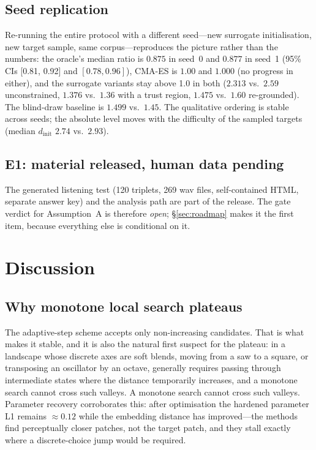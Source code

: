 \documentclass[11pt]{article}
\newcommand{\rRetU}{1.45}
\newcommand{\rGS}{2.59}
\newcommand{\rGST}{1.36}
\newcommand{\rGR}{1.60}
\newcommand{\rGT}{0.875}
\newcommand{\rGTci}{[0.81, 0.92]}
\newcommand{\rCMA}{1.00}
\newcommand{\sOneGT}{0.877}
\newcommand{\sOneCMA}{1.000}
\newcommand{\sOneGS}{2.313}
\newcommand{\sOneGST}{1.376}
\newcommand{\sOneGR}{1.475}
\newcommand{\sOneRetU}{1.499}
\begin{document}
\subsection{Seed replication}

Re-running the entire protocol with a different seed---new surrogate
initialisation, new target sample, same corpus---reproduces the picture rather
than the numbers: the oracle's median ratio is $\rGT$ in seed~0 and $\sOneGT$
in seed~1 (95\% CIs \rGTci{} and $[0.78, 0.96]$), CMA-ES is $\rCMA$ and
$\sOneCMA$ (no progress in either), and the surrogate variants stay above 1.0
in both ($\sOneGS$ vs.\ $\rGS$ unconstrained, $\sOneGST$ vs.\ $\rGST$ with a
trust region, $\sOneGR$ vs.\ $\rGR$ re-grounded). The blind-draw baseline is
$\sOneRetU$ vs.\ $\rRetU$. The qualitative ordering is stable across seeds;
the absolute level moves with the difficulty of the sampled targets (median
$d_{\text{init}}$ $2.74$ vs.\ $2.93$).

\subsection{E1: material released, human data pending}

The generated listening test (120 triplets, 269 wav files, self-contained HTML,
separate answer key) and the analysis path are part of the release. The gate
verdict for Assumption~A is therefore \emph{open}; \S\ref{sec:roadmap} makes it
the first item, because everything else is conditional on it.

\section{Discussion}\label{sec:discussion}

\subsection{Why monotone local search plateaus}\label{sec:disc-plateau}

The adaptive-step scheme accepts only non-increasing candidates. That is what
makes it stable, and it is also the natural first suspect for the plateau: in a
landscape whose discrete axes are soft blends, moving from a saw to a square, or
transposing an oscillator by an octave, generally requires passing through
intermediate states where the distance temporarily increases, and a monotone
search cannot cross such valleys. A monotone search cannot cross such valleys.
Parameter recovery corroborates this: after optimisation the hardened parameter
L1 remains $\approx 0.12$ while the embedding distance has improved---the
methods find perceptually closer patches, not the target patch, and they stall
exactly where a discrete-choice jump would be required.
\end{document}
